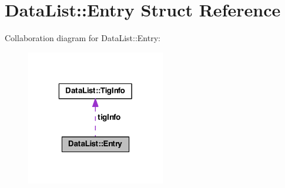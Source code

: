 \hypertarget{struct_data_list_1_1_entry}{\section{Data\-List\-:\-:Entry Struct Reference}
\label{struct_data_list_1_1_entry}
}


Collaboration diagram for Data\-List\-:\-:Entry\-:
\nopagebreak
\begin{figure}[H]
\begin{center}
\leavevmode
\includegraphics[width=172pt]{struct_data_list_1_1_entry__coll__graph}
\end{center}
\end{figure}
